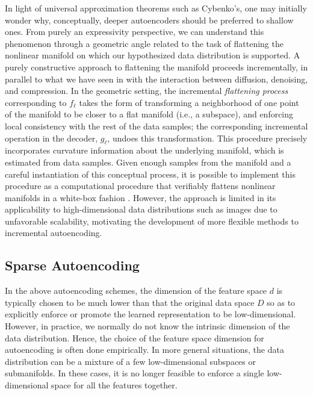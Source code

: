 \documentclass[../../book-main.tex]{subfiles}
\begin{document}
In light of universal approximation theorems such as Cybenko's, one
may initially wonder why, conceptually, deeper autoencoders should be preferred
to shallow ones.
From purely an expressivity perspective, we can understand this phenomenon
through a geometric angle related to the task of flattening the nonlinear
manifold on which our hypothesized data distribution is supported. A purely
constructive approach to flattening the manifold proceeds incrementally, in
parallel to what we have seen in  with
the interaction between diffusion, denoising, and compression. In the geometric
setting, the incremental \textit{flattening process} corresponding to $f_{\ell}$
takes the form of transforming a neighborhood of one point of the manifold to be
closer to a flat manifold (i.e., a subspace), and enforcing local consistency
with the rest of the data samples; the corresponding incremental operation in
the decoder, $g_{\ell}$, undoes this transformation. This procedure precisely
incorporates curvature information about the underlying manifold, which is
estimated from data samples. Given enough samples from the manifold and
a careful instantiation of this conceptual process, it is possible to implement
this procedure as a computational procedure that verifiably flattens nonlinear
manifolds in a white-box fashion \cite{Psenka-JMLR24}. However, the approach is
limited in its applicability to high-dimensional data distributions such as
images due to unfavorable scalability, motivating the development of more
flexible methods to incremental autoencoding.

\subsection{Sparse Autoencoding}
In the above autoencoding schemes, the dimension of the feature space
$d$ is typically chosen to be much lower than that the original data
space $D$ so as to explicitly enforce or promote the learned
representation to be low-dimensional. However, in practice, we
normally do not know the intrinsic dimension of the data
distribution. Hence, the choice of the feature space dimension for
autoencoding is often done empirically. In more general situations,
the data distribution can be a mixture of a few low-dimensional
subspaces or submanifolds. In these cases, it is no longer feasible
to enforce a single low-dimensional space for all the features together.
\end{document}
